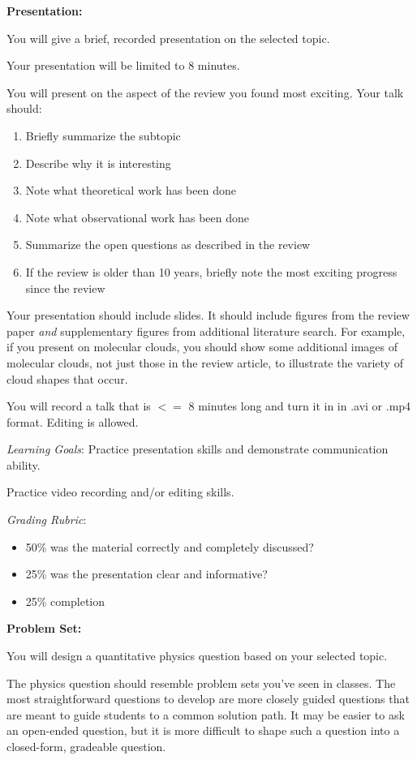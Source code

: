 \documentclass{article}
\begin{document}
\noindent \textbf{Presentation:}

You will give a brief, recorded presentation on the selected topic. 

Your presentation will be limited to 8 minutes.

You will present on the aspect of the review you found most exciting.
Your talk should:

\begin{enumerate}
    \item Briefly summarize the subtopic
    \item Describe why it is interesting
    \item Note what theoretical work has been done
    \item Note what observational work has been done
    \item Summarize the open questions as described in the review
    \item If the review is older than 10 years, briefly note the
    most exciting progress since the review
\end{enumerate}

Your presentation should include slides.
It should include figures from the review paper \emph{and} supplementary figures
from additional literature search.
For example, if you present on molecular clouds, you should show some
additional images of molecular clouds, not just those in the review article, to
illustrate the variety of cloud shapes that occur.

You will record a talk that is $<=$ 8 minutes long and turn it in in .avi or .mp4
format.  Editing is allowed.

\textit{Learning Goals}:
    Practice presentation skills and demonstrate communication ability.

    Practice video recording and/or editing skills.

\textit{Grading Rubric}:
\begin{itemize}
    \item 50\% was the material correctly and completely discussed?
    \item 25\% was the presentation clear and informative?
    \item 25\% completion
\end{itemize}

\noindent \textbf{Problem Set:}

You will design a quantitative physics question based on your selected topic.

The physics question should resemble problem sets you've seen in classes.
The most straightforward questions to develop are more closely guided questions that are meant to
guide students to a common solution path.
It may be easier to ask an open-ended question, but it is more difficult to shape
such a question into a closed-form, gradeable question.
\end{document}
